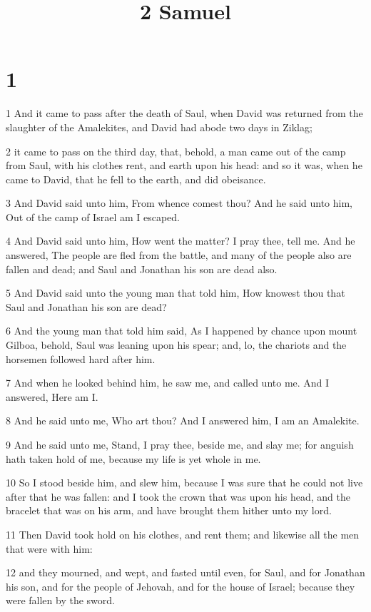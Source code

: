 

\title{2 Samuel}

\chapter{1}

\par 1 And it came to pass after the death of Saul, when David was returned from the slaughter of the Amalekites, and David had abode two days in Ziklag;
\par 2 it came to pass on the third day, that, behold, a man came out of the camp from Saul, with his clothes rent, and earth upon his head: and so it was, when he came to David, that he fell to the earth, and did obeisance.
\par 3 And David said unto him, From whence comest thou? And he said unto him, Out of the camp of Israel am I escaped.
\par 4 And David said unto him, How went the matter? I pray thee, tell me. And he answered, The people are fled from the battle, and many of the people also are fallen and dead; and Saul and Jonathan his son are dead also.
\par 5 And David said unto the young man that told him, How knowest thou that Saul and Jonathan his son are dead?
\par 6 And the young man that told him said, As I happened by chance upon mount Gilboa, behold, Saul was leaning upon his spear; and, lo, the chariots and the horsemen followed hard after him.
\par 7 And when he looked behind him, he saw me, and called unto me. And I answered, Here am I.
\par 8 And he said unto me, Who art thou? And I answered him, I am an Amalekite.
\par 9 And he said unto me, Stand, I pray thee, beside me, and slay me; for anguish hath taken hold of me, because my life is yet whole in me.
\par 10 So I stood beside him, and slew him, because I was sure that he could not live after that he was fallen: and I took the crown that was upon his head, and the bracelet that was on his arm, and have brought them hither unto my lord.
\par 11 Then David took hold on his clothes, and rent them; and likewise all the men that were with him:
\par 12 and they mourned, and wept, and fasted until even, for Saul, and for Jonathan his son, and for the people of Jehovah, and for the house of Israel; because they were fallen by the sword.
